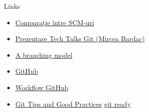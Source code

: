 \documentclass{beamer}
\begin{document}
\begin{frame}[label=l]{Links}
  \begin{itemize}
    \item \href{http://en.wikipedia.org/wiki/Comparison_of_revision_control_software}{Comparație între SCM-uri}
    \item \href{http://talks.rosedu.org/prezentari/prezentarea03}{Prezentare
    Tech Talks Git (Mircea Bardac)}
    \item \href{http://nvie.com/posts/a-successful-git-branching-model/}{A
    branching model}
    \item \href{http://github.com}{GitHub}
    \item
    \href{http://www.eqqon.com/index.php/Collaborative_Github_Workflow}{Workflow
    GitHub}
    \item
    \href{http://techblog.rosedu.org/git-good-practices.html}{Git Tips and
    Good Practices}
    \href{http://gitready.com/}{git ready}
  \end{itemize}
\end{frame}
\end{document}
